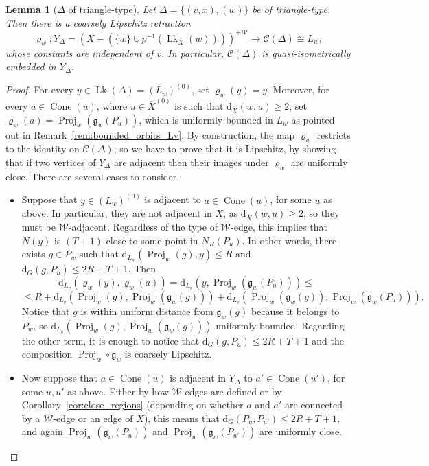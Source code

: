 \documentclass[svgnames]{amsart}
\theoremstyle{plain}
\newtheorem{lemma}[thm]{Lemma}
\theoremstyle{definition}
\newcommand{\C}{\mathcal C}
\newcommand{\ov}[1]{\overline{#1}}
\newcommand{\dist}{\mathrm{d}}
\newcommand{\link}{\operatorname{Lk}}
\newcommand{\Proj}{\operatorname{Proj}}
\newcommand{\W}{\mathcal{W}}
\newcommand{\gate}{\mathfrak{g}}
\newcommand{\Squid}{\operatorname{Cone}}
\begin{document}
\begin{lemma}[$\Delta$ of triangle-type]\label{lem:qi_embedding_triangle_case}
    Let $\Delta=\{(v,x), (w)\}$ be of triangle-type. Then there is a coarsely Lipschitz retraction
    $$\varrho_w\colon Y_\Delta=\left(X-\left(\{w\}\cup p^{-1}(\link_{\ov X}(w))\right)\right)^{+\W}\to \C(\Delta)\cong L_w,$$
    whose constants are independent of $v$. In particular, $\C(\Delta)$ is quasi-isometrically embedded in $Y_\Delta$.
\end{lemma}


\begin{proof}
For every $y\in\link(\Delta)=(L_w)^{(0)}$, set $\varrho_w(y)=y$. Moreover, for every $a\in\Squid(u)$, where $u\in\ov{X}^{(0)}$ is such that $\dist_{\ov{X}}(w,u)\ge 2$, set $\varrho_w(a)=\Proj_w(\gate_w(P_u))$, which is uniformly bounded in $L_w$ as pointed out in Remark~\ref{rem:bounded_orbits_Lv}. By construction, the map $\varrho_w$ restricts to the identity on $\C(\Delta)$; so we have to prove that it is Lipschitz, by showing that if two vertices of $Y_\Delta$ are adjacent then their images under $\varrho_w$ are uniformly close. There are several cases to consider.
\begin{itemize}
    \item Suppose that $y\in (L_w)^{(0)}$ is adjacent to $a\in \Squid(u)$, for some $u$ as above. In particular, they are not adjacent in $X$, as $\dist_{\ov{X}}(w,u)\ge 2$, so they must be $\W$-adjacent. Regardless of the type of $\W$-edge, this implies that $N(y)$ is $(T+1)$-close to some point in $N_R(P_u)$. In other words, there exists $g\in P_w$ such that $\dist_{L_w}(\Proj_w(g), y)\le R$ and $\dist_G(g, P_u)\le 2R+T+1$. Then
    $$\dist_{L_v}(\varrho_w(y),\varrho_w(a))=\dist_{L_v}(y,\Proj_w(\gate_w(P_u)))\le $$
    $$\le R+\dist_{L_v}(\Proj_w(g),\Proj_w(\gate_w(g)))+\dist_{L_v}(\Proj_w(\gate_w(g)),\Proj_w(\gate_w(P_u))).$$
    Notice that $g$ is within uniform distance from $\gate_w(g)$ because it belongs to $P_w$, so $\dist_{L_v}(\Proj_w(g),\Proj_w(\gate_w(g)))$ uniformly bounded. Regarding the other term, it is enough to notice that $\dist_G(g, P_u)\le 2R+T+1$ and the composition $\Proj_w\circ \gate_w$ is coarsely Lipschitz.


\item Now suppose that $a\in \Squid(u)$ is adjacent in $Y_\Delta$ to $a'\in \Squid(u')$, for some $u,u'$ as above. Either by how $\W$-edges are defined or by Corollary~\ref{cor:close_regions} (depending on whether $a$ and $a'$ are connected by a $\W$-edge or an edge of $X$), this means that $\dist_G(P_u, P_{u'})\le 2R+T+1$, and again $\Proj_w(\gate_w(P_u))$ and $\Proj_w(\gate_w(P_{u'}))$ are uniformly close.\qedhere
\end{itemize}
\end{proof}
\end{document}
